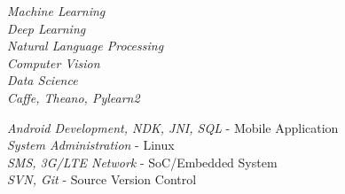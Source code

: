 \documentclass[10pt]{article} %
\begin{document}

{
\textit{Machine Learning}\\
\textit{Deep Learning}\\
\textit{Natural Language Processing}\\
\textit{Computer Vision}\\
\textit{Data Science}\\
\textit{Caffe, Theano, Pylearn2}
}


{
\textit{Android Development, NDK, JNI, SQL} - Mobile Application\\
\textit{System Administration} - Linux\\
\textit{SMS, 3G/LTE Network} - SoC/Embedded System\\
\textit{SVN, Git} - Source Version Control
}





\end{document}
